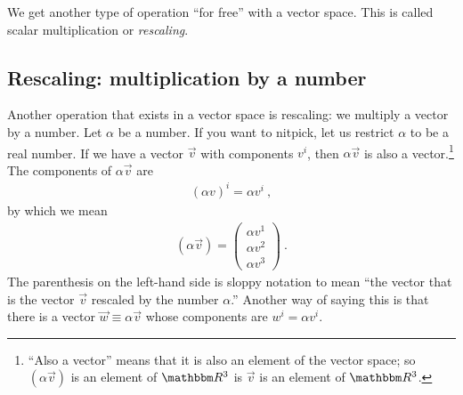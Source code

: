 \documentclass[12pt]{article}
\begin{document}
We get another type of operation ``for free'' with a vector space. This is called scalar multiplication or \emph{rescaling}.










\subsection{Rescaling: multiplication by a number}

Another operation that exists in a vector space is rescaling: we multiply a vector by a number. 
Let $\alpha$ be a number. If you want to nitpick, let us restrict $\alpha$ to be a real number. If we have a vector $\vec{v}$ with components $v^i$, then $\alpha \vec{v}$ is also a vector.\footnote{``Also a vector'' means that it is also an element of the vector space; so $(\alpha\vec{v})$ is an element of $\RR ^3$ is $\vec{v}$ is an element of $\RR ^3$. } The components of $\alpha \vec{v}$ are
\begin{align}
    (\alpha v)^i = \alpha v^i \ ,
\end{align}
by which we mean
\begin{align}
    (\alpha\vec{v})
    =
    \begin{pmatrix}
        \alpha v^1 \\
        \alpha v^2 \\
        \alpha v^3 
    \end{pmatrix} \ .
\end{align}
The parenthesis on the left-hand side is sloppy notation to mean ``the vector that is the vector $\vec{v}$ rescaled by the number  $\alpha$.'' Another way of saying this is that there is a vector $\vec{w}\equiv \alpha\vec{v}$ whose components are $w^i = \alpha v^i$.
\end{document}
